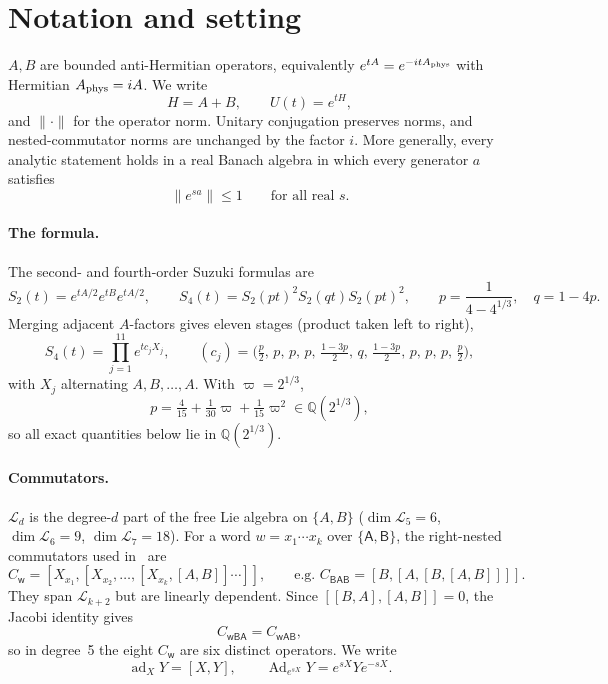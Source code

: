 \documentclass[11pt]{article}
\newcommand{\ad}{\operatorname{ad}}
\newcommand{\Ad}{\operatorname{Ad}}
\newcommand{\norm}[1]{\lVert #1\rVert}
\newcommand{\Qc}{\mathbb{Q}(2^{1/3})}
\newcommand{\Lie}{\mathcal{L}}
\newcommand{\C}[1]{C_{\mathsf{#1}}}
\theoremstyle{plain}
\theoremstyle{definition}
\theoremstyle{remark}
\begin{document}
\section{Notation and setting}\label{sec:notation}

$A,B$ are bounded anti-Hermitian operators, equivalently $e^{tA}=e^{-itA_{\rm phys}}$ with Hermitian
$A_{\rm phys}=iA$. We write
\[
H=A+B,\qquad U(t)=e^{tH},
\]
and $\norm\cdot$ for the operator norm. Unitary conjugation preserves norms, and nested-commutator
norms are unchanged by the factor $i$. More generally, every analytic statement holds in a real Banach
algebra in which every generator $a$ satisfies
\[
\norm{e^{sa}}\le1\qquad\text{for all real }s.
\]

\paragraph{The formula.} The second- and fourth-order Suzuki formulas are
\[
S_2(t)=e^{tA/2}e^{tB}e^{tA/2},\qquad
S_4(t)=S_2(pt)^2S_2(qt)S_2(pt)^2,\qquad p=\frac1{4-4^{1/3}},\quad q=1-4p .
\]
Merging adjacent $A$-factors gives eleven stages (product taken left to right),
\[
S_4(t)=\prod_{j=1}^{11}e^{tc_jX_j},\qquad
(c_j)=\bigl(\tfrac p2,\,p,\,p,\,p,\,\tfrac{1-3p}2,\,q,\,\tfrac{1-3p}2,\,p,\,p,\,p,\,\tfrac p2\bigr),
\]
with $X_j$ alternating $A,B,\dots,A$. With $\varpi=2^{1/3}$,
\[
p=\tfrac4{15}+\tfrac1{30}\varpi+\tfrac1{15}\varpi^2\in\Qc,
\]
so all exact quantities below lie in $\Qc$.

\paragraph{Commutators.} $\Lie_d$ is the degree-$d$ part of the free Lie algebra on $\{A,B\}$
($\dim\Lie_5=6$, $\dim\Lie_6=9$, $\dim\Lie_7=18$). For a word $w=x_1\cdots x_k$ over
$\{\mathsf A,\mathsf B\}$, the right-nested commutators used in~\cite{Childs2021} are
\[
\C w=[X_{x_1},[X_{x_2},\dots,[X_{x_k},[A,B]]\cdots]],\qquad\text{e.g. }\C{BAB}=[B,[A,[B,[A,B]]]].
\]
They span $\Lie_{k+2}$ but are linearly dependent. Since $[[B,A],[A,B]]=0$, the Jacobi identity gives
\[
\C{w\mathsf{BA}}=\C{w\mathsf{AB}},
\]
so in degree~5 the eight $\C w$ are six distinct operators. We write
\[
\ad_XY=[X,Y],\qquad \Ad_{e^{sX}}Y=e^{sX}Ye^{-sX}.
\]
\end{document}
